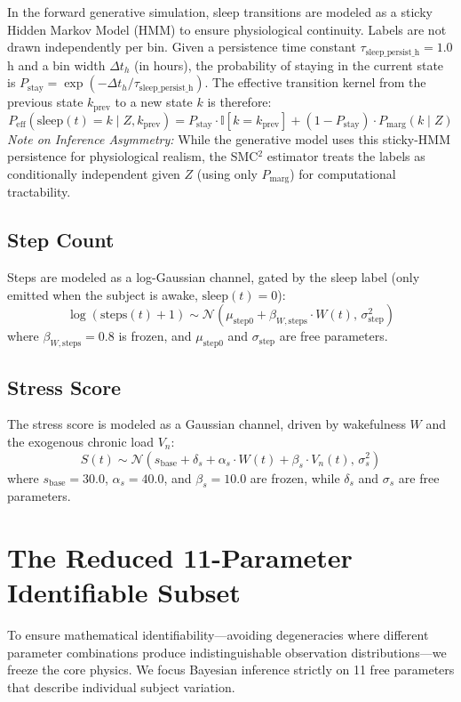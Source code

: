 \documentclass[11pt,a4paper]{article}
\begin{document}
In the forward generative simulation, sleep transitions are modeled as a sticky Hidden Markov Model (HMM) to ensure physiological continuity. Labels are not drawn independently per bin. Given a persistence time constant $\tau_{\text{sleep\_persist\_h}} = 1.0$\,h and a bin width $\Delta t_h$ (in hours), the probability of staying in the current state is $P_{\text{stay}} = \exp(-\Delta t_h / \tau_{\text{sleep\_persist\_h}})$. The effective transition kernel from the previous state $k_{\text{prev}}$ to a new state $k$ is therefore:
\[
P_{\text{eff}}(\text{sleep}(t) = k \mid Z, k_{\text{prev}}) = P_{\text{stay}} \cdot \mathbb{I}[k = k_{\text{prev}}] + (1 - P_{\text{stay}}) \cdot P_{\text{marg}}(k \mid Z)
\]
\textit{Note on Inference Asymmetry:} While the generative model uses this sticky-HMM persistence for physiological realism, the SMC$^2$ estimator treats the labels as conditionally independent given $Z$ (using only $P_{\text{marg}}$) for computational tractability.

\subsection{Step Count}
Steps are modeled as a log-Gaussian channel, gated by the sleep label (only emitted when the subject is awake, $\text{sleep}(t) = 0$):
\[
\log(\text{steps}(t) + 1) \sim \mathcal{N}\left(\mu_{\text{step}0} + \beta_{W,\text{steps}} \cdot W(t), \, \sigma_{\text{step}}^2\right)
\]
where $\beta_{W,\text{steps}} = 0.8$ is frozen, and $\mu_{\text{step}0}$ and $\sigma_{\text{step}}$ are free parameters.

\subsection{Stress Score}
The stress score is modeled as a Gaussian channel, driven by wakefulness $W$ and the exogenous chronic load $V_n$:
\[
S(t) \sim \mathcal{N}\left(s_{\text{base}} + \delta_s + \alpha_s \cdot W(t) + \beta_s \cdot V_n(t), \, \sigma_s^2\right)
\]
where $s_{\text{base}} = 30.0$, $\alpha_s = 40.0$, and $\beta_s = 10.0$ are frozen, while $\delta_s$ and $\sigma_s$ are free parameters.

\section{The Reduced 11-Parameter Identifiable Subset}

To ensure mathematical identifiability—avoiding degeneracies where different parameter combinations produce indistinguishable observation distributions—we freeze the core physics. We focus Bayesian inference strictly on 11 free parameters that describe individual subject variation. 
\end{document}
